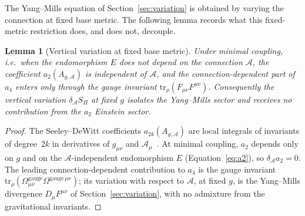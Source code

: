 \documentclass[12pt,a4paper]{article}
\theoremstyle{remark}
\theoremstyle{plain}
\newtheorem{lemma}{Lemma}
\theoremstyle{definition}
\begin{document}
      The Yang--Mills equation of Section~\ref{sec:variation} is
      obtained by varying the connection at fixed base metric.
      The following lemma records what this fixed-metric restriction
      does, and does not, decouple.

      \begin{lemma}[Vertical variation at fixed base metric]
        \label{lem:decoupling}
        Under minimal coupling, i.e.\ when the endomorphism $E$ does
        not depend on the connection $\mathcal{A}$, the coefficient
        $a_2(A_{g,\mathcal{A}})$ is independent of $\mathcal{A}$, and
        the connection-dependent part of $a_4$ enters only through the
        gauge invariant $\mathrm{tr}_\rho(F_{\mu\nu}F^{\mu\nu})$.
        Consequently the vertical variation
        $\delta_\mathcal{A} S_\Pi$ at fixed $g$ isolates the
        Yang--Mills sector and receives no contribution from the
        $a_2$ Einstein sector.
      \end{lemma}

      \begin{proof}
        The Seeley--DeWitt coefficients $a_{2k}(A_{g,\mathcal{A}})$
        are local integrals of invariants of degree~$2k$ in
        derivatives of $g_{\mu\nu}$ and
        $\mathcal{A}_\mu$~\cite{Vassilevich2003}.
        At minimal coupling, $a_2$ depends only on $g$ and on the
        $\mathcal{A}$-independent endomorphism $E$
        (Equation~\eqref{eq:a2}), so $\delta_\mathcal{A} a_2 = 0$.
        The leading connection-dependent contribution to $a_4$ is the
        gauge invariant $\mathrm{tr}_\rho(\Omega^{\mathrm{gauge}}_{\mu\nu}
        \Omega^{\mathrm{gauge}\,\mu\nu})$; its variation with respect
        to $\mathcal{A}$, at fixed $g$, is the Yang--Mills divergence
        $D_\mu F^{\mu\nu}$ of Section~\ref{sec:variation}, with no
        admixture from the gravitational invariants.
      \end{proof}
\end{document}
